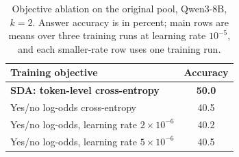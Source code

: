 \begin{table}[tbp]
\centering
\caption{Objective ablation on the original pool, Qwen3-8B, $k=2$. Answer
accuracy is in percent; main rows are means over three training runs at
learning rate $10^{-5}$, and each smaller-rate row uses one training run.}
\label{tab:objective}
\small
\setlength{\tabcolsep}{6pt}
\begin{tabular}{lc}
\toprule
Training objective & Accuracy \\
\midrule
\textbf{SDA: token-level cross-entropy} & \textbf{50.0} \\
Yes/no log-odds cross-entropy & 40.5 \\
Yes/no log-odds, learning rate $2\times10^{-6}$ & 40.2 \\
Yes/no log-odds, learning rate $5\times10^{-6}$ & 40.5 \\
\bottomrule
\end{tabular}
\end{table}
